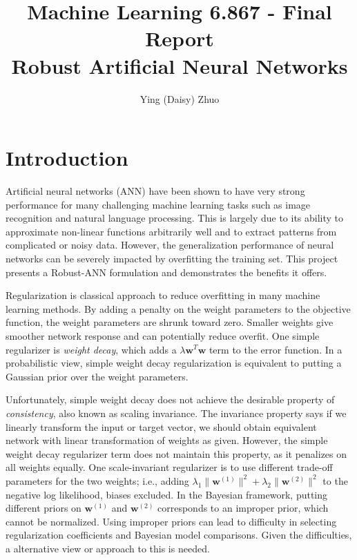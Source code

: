 \documentclass[twoside,12pt]{article}
\newcommand{\M}[1]{\boldsymbol{\mathbf{#1}}}
\begin{document}
\title{Machine Learning 6.867 - Final Report\\Robust Artificial Neural Networks}
\author{Ying (Daisy) Zhuo}

\maketitle



\section{Introduction}

Artificial neural networks (ANN) have been shown to have very strong performance for many challenging machine learning tasks such as image recognition and natural language processing. This is largely due to its ability to approximate non-linear functions arbitrarily well and to extract patterns from complicated or noisy data. However, the generalization performance of neural networks can be severely impacted by overfitting the training set. This project presents a Robust-ANN formulation and demonstrates the benefits it offers. 

Regularization is classical approach to reduce overfitting in many machine learning methods. By adding a penalty on the weight parameters to the objective function, the weight parameters are shrunk toward zero. Smaller weights give smoother network response and can potentially reduce overfit. One simple regularizer is \emph{weight decay}, which adds a $\lambda \M w ^T \M w$ term to the error function. In a probabilistic view, simple weight decay regularization is equivalent to putting a Gaussian prior over the weight parameters. 

Unfortunately, simple weight decay does not achieve the desirable property of \emph{consistency}, also known as scaling invariance. The invariance property says if we linearly transform the input or target vector, we should obtain equivalent network with linear transformation of weights as given. However, the simple weight decay regularizer term does not maintain this property, as it penalizes on all weights equally. One scale-invariant regularizer is to use different trade-off parameters for the two weights; i.e., adding $\lambda_1 \| \M w^{(1)}\|^2 + \lambda_2 \| \M w^{(2)}\|^2$ to the negative log likelihood, biases excluded. In the Bayesian framework, putting different priors on $\M w^{(1)}$ and $\M w^{(2)}$ corresponds to an improper prior, which cannot be normalized. Using improper priors can lead to difficulty in selecting regularization coefficients and Bayesian model comparisons. Given the difficulties, a alternative view or approach to this is needed.
\end{document}
